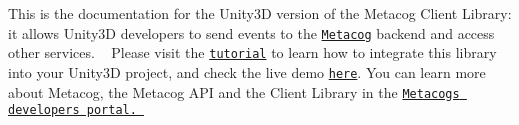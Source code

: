 This is the documentation for the Unity3D version of the Metacog Client Library\+: it allows Unity3D developers to send events to the \href{//www.metacog.com}{\tt Metacog} backend and access other services. ~\newline
 Please visit the \href{http://www.metacog.com/developer/examples/unity3d_tutorial}{\tt tutorial} to learn how to integrate this library into your Unity3D project, and check the live demo \href{http://www.metacog.com/developer/examples/unity3d_demo}{\tt here}. You can learn more about Metacog, the Metacog A\+PI and the Client Library in the \href{https://developer.metacog.com/}{\tt Metacog\textquotesingle{}s developers portal. } 